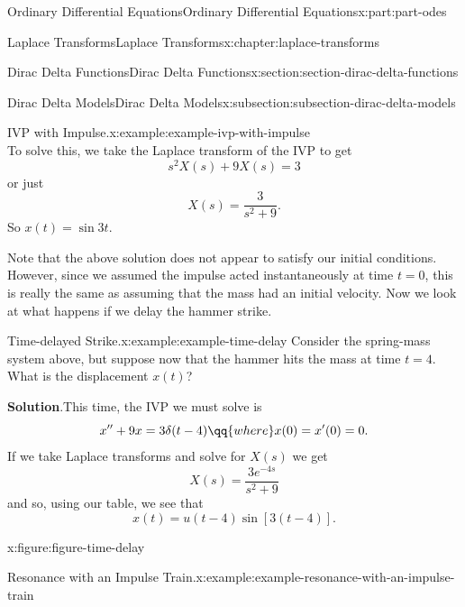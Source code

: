 \documentclass[oneside,10pt,]{book}
\newcommand{\blocktitlefont}{\relax}
\numberwithin{equation}{part}
\begin{document}
\begin{partptx}{Ordinary Differential Equations}{}{Ordinary Differential Equations}{}{}{x:part:part-odes}
\begin{chapterptx}{Laplace Transforms}{}{Laplace Transforms}{}{}{x:chapter:laplace-transforms}
\begin{sectionptx}{Dirac Delta Functions}{}{Dirac Delta Functions}{}{}{x:section:section-dirac-delta-functions}
\begin{subsectionptx}{Dirac Delta Models}{}{Dirac Delta Models}{}{}{x:subsection:subsection-dirac-delta-models}
\begin{example}{IVP with Impulse.}{x:example:example-ivp-with-impulse}
\begin{equation*}
\end{equation*}
To solve this, we take the Laplace transform of the IVP to get%
\begin{equation*}
s^{2}X(s)+9X(s) = 3
\end{equation*}
or just%
\begin{equation*}
X(s) = \frac{3}{s^{2}+9}.
\end{equation*}
So \(x(t) = \sin3t\).%
\end{example}
Note that the above solution does not appear to satisfy our initial conditions. However, since we assumed the impulse acted instantaneously at time \(t=0\), this is really the same as assuming that the mass had an initial velocity. Now we look at what happens if we delay the hammer strike.%
\begin{example}{Time-delayed Strike.}{x:example:example-time-delay}%
Consider the spring-mass system above, but suppose now that the hammer hits the mass at time \(t=4\). What is the displacement \(x(t)\)?%
\par\smallskip%
\noindent\textbf{\blocktitlefont Solution}.\hypertarget{g:solution:idp105548781616928}{}\quad{}This time, the IVP we must solve is%
\begin{equation*}
x''+9x = 3\delta(t-4)\qq{where}x(0)=x'(0)=0.
\end{equation*}
If we take Laplace transforms and solve for \(X(s)\) we get%
\begin{equation*}
X(s) = \frac{3e^{-4s}}{s^{2}+9}
\end{equation*}
and so, using our table, we see that%
\begin{equation*}
x(t) = u(t-4)\sin[3(t-4)].
\end{equation*}
%
\end{example}
\begin{figureptx}{}{x:figure:figure-time-delay}{}%
\begin{image}{0}{1}{0}%
%
\end{image}%
\tcblower
\end{figureptx}%
\begin{example}{Resonance with an Impulse Train.}{x:example:example-resonance-with-an-impulse-train}%

\end{example}
\end{subsectionptx}
\end{sectionptx}
\end{chapterptx}
\end{partptx}
\end{document}
